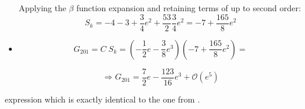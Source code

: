 \begin{itemize}
\[			\]
			\indent Applying the $\beta$ function expansion and retaining terms of up to second order:
			\begin{equation}
			S_k = -4 - 3 + \dfrac{3}{4}e^2 + \dfrac{53}{2} \dfrac{3}{4} e^2 = -7 + \dfrac{165}{8}e^2
			\label{eq:S_k}
			\end{equation}
			\item[\GMVred{Step 6. }] 
			\[
			G_{201} = C \; S_k = \left(-\dfrac{1}{2}e - \dfrac{3}{8}e^3 \right) \left(-7 + \dfrac{165}{8}e^2\right) =
			\]
			\begin{GMVbox}
			\begin{equation}
		 	\Rightarrow G_{201} = \dfrac{7}{2}e - \dfrac{123}{16}e^3 + \mathcal{O}(e^5)
			\end{equation}
			\end{GMVbox}
			\end{itemize}
			\noindent expression which is exactly identical to the one from \cite[Kaula][p.38]{Kaula}.
